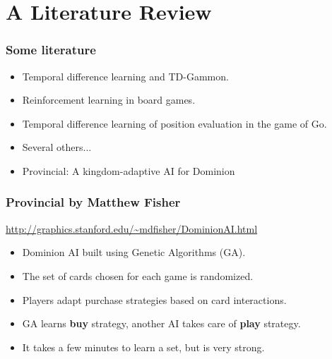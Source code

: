 \documentclass[]{beamer}
\begin{document}

\section{A Literature Review}

\begin{frame}
\frametitle{Some literature}
  \begin{itemize}
   \item Temporal difference learning and TD-Gammon. \cite{tesauro1995temporal}
   \item Reinforcement learning in board games.  \cite{ghory2004reinforcement}
   \item Temporal difference learning of position evaluation in the game of Go. \cite{schraudolph1994temporal}
   \item Several others...
   \item Provincial: A kingdom-adaptive AI for Dominion \cite{Fisher2014} 
  \end{itemize}
  
\end{frame}



\begin{frame}
\frametitle{Provincial by Matthew Fisher}
\begin{center}

 \begin{small}\begin{small}\begin{small}
 \url{http://graphics.stanford.edu/~mdfisher/DominionAI.html} \cite{Fisher2014}
 \end{small}\end{small}\end{small}
\end{center}

  \begin{itemize}
   \item Dominion AI built using Genetic Algorithms (GA).
   \item The set of cards chosen for each game is randomized.
   \item Players adapt purchase strategies based on card interactions.
   \item GA learns \textbf{buy} strategy, another AI takes care of \textbf{play} strategy.
   \item It takes a few minutes to learn a set, but is very strong.
  \end{itemize}
  
\end{frame}
\end{document}
